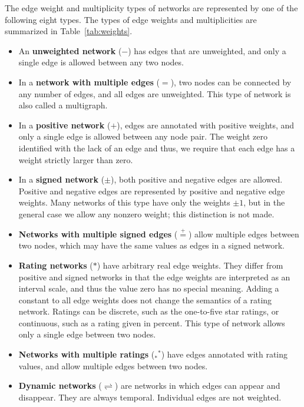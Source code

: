 \documentclass{article}
\begin{document}
The edge weight and multiplicity types of networks are represented by
one of the following eight types. 
The types of edge weights and multiplicities are summarized in
Table~\ref{tab:weights}. 
\begin{itemize}
\item An \textbf{unweighted network} ($-$) 
  has edges that are
  unweighted, and only a 
  single edge is allowed between any two nodes.  
\item In a \textbf{network with multiple edges} ($=$), 
  two nodes can be
  connected by any number of edges, and all edges are unweighted. This
  type of network is also called a multigraph.  
\item In a \textbf{positive network} ($+$), 
  edges are annotated
  with positive weights, and only a single edge is allowed between
  any node pair.  The weight zero identified with the lack of an edge
  and thus, we require that each edge has a weight strictly larger than
  zero. 
\item In a \textbf{signed network} ($\pm$), 
  both positive and negative edges are 
  allowed. Positive and negative edges are represented by positive and
  negative edge weights. Many networks of this type have only the
  weights $\pm 1$, but in the general case we allow any nonzero weight;
  this distinction is not made. 
\item \textbf{Networks with multiple signed edges} ($\stackrel{+}{=}$) 
  allow multiple edges between two nodes, which may have the same values
  as edges in a signed network.  
\item \textbf{Rating networks} ($*$) 
  have arbitrary real edge weights.  They
  differ from positive and signed networks in that the edge weights are
  interpreted as an interval scale, and thus the value zero has no
  special meaning.  Adding a constant to all edge weights does not
  change the semantics of a rating network. 
  Ratings can be discrete, such as the one-to-five star ratings, or
  continuous, such as a rating given in percent. 
  This type of network allows only a single edge between two nodes. 
\item \textbf{Networks with multiple ratings} ($_*{}^*$) 
  have edges annotated
  with rating values, and allow multiple edges between two nodes.
\item \textbf{Dynamic networks} ($\rightleftharpoons$) are networks in
  which edges can appear and disappear.  They are always
  temporal. Individual edges are not weighted. 
\end{itemize}
\end{document}
